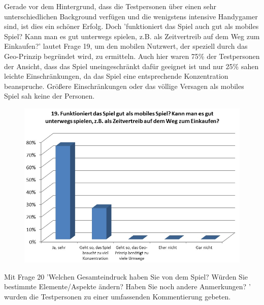 \documentclass[extern,palatino]{cgBA}
\begin{document}
Gerade vor dem Hintergrund, dass die Testpersonen über einen sehr unterschiedlichen Background  verfügen und die wenigstens intensive Handygamer sind, ist dies ein schöner Erfolg. Doch 'funktioniert das Spiel auch gut als mobiles Spiel? Kann man es gut unterwegs spielen, z.B. als Zeitvertreib auf dem Weg zum Einkaufen?' lautet Frage 19, um den mobilen Nutzwert, der speziell durch das Geo-Prinzip begründet wird, zu ermitteln. Auch hier waren 75\% der Testpersonen der Ansicht, dass das Spiel uneingeschränkt dafür geeignet ist und nur 25\% sahen leichte Einschränkungen, da das Spiel eine  entsprechende Konzentration beanspruche. Größere Einschränkungen oder das völlige Versagen als mobiles Spiel sah keine der Personen. 
\begin{figure}[H]
	\centering
	\includegraphics[width=1\textwidth]{table16.jpg}
\end{figure}
Mit Frage 20 'Welchen Gesamteindruck haben Sie von dem Spiel? Würden Sie bestimmte Elemente/Aspekte ändern? Haben Sie noch andere Anmerkungen? ' wurden die Testpersonen zu einer umfassenden Kommentierung gebeten.\\
\end{document}
